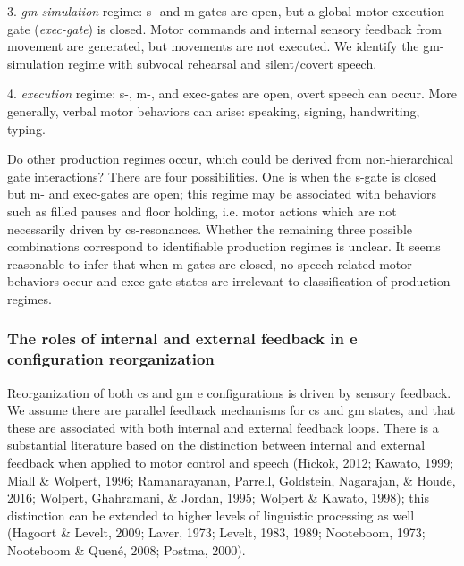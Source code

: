 3. \textit{gm-simulation} regime: s- and m-gates are open,  but a global motor execution gate (\textit{exec-gate}) is closed. Motor commands and internal sensory feedback from movement are generated, but movements are not executed. We identify the gm-simulation regime with subvocal rehearsal and silent/covert speech. 

4. \textit{execution} regime: s-, m-, and exec-gates are open, overt speech can occur. More generally, verbal motor behaviors can arise: speaking, signing, handwriting, typing.

  Do other production regimes occur, which could  be derived from non-hierarchical gate interactions? There are four possibilities. One is when the s-gate is closed but m- and exec-gates are open; this regime may be associated with behaviors such as filled pauses and floor holding, i.e. motor actions which are not necessarily driven by cs-resonances. Whether the remaining three possible combinations correspond to identifiable production regimes is unclear. It seems reasonable to infer that when m-gates are closed, no speech-related motor behaviors occur and exec-gate states are irrelevant to classification of production regimes.

\subsubsection{The roles of internal and external feedback in e configuration reorganization}

Reorganization of both cs and gm e configurations is driven by sensory feedback. We assume there are parallel feedback mechanisms for cs and gm states, and that these are associated with both internal and external feedback loops. There is a substantial literature based on the distinction between internal and external feedback when applied to motor control and speech (Hickok, 2012; Kawato, 1999; Miall \& Wolpert, 1996; Ramanarayanan, Parrell, Goldstein, Nagarajan, \& Houde, 2016; Wolpert, Ghahramani, \& Jordan, 1995; Wolpert \& Kawato, 1998); this distinction can be extended to higher levels of linguistic processing as well (Hagoort \& Levelt, 2009; Laver, 1973; Levelt, 1983, 1989; Nooteboom, 1973; Nooteboom \& Quené, 2008; Postma, 2000).

